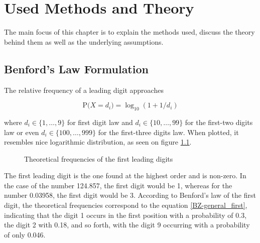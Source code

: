 \chapter{Used Methods and Theory}

The main focus of this chapter is to explain the methods used, discuss the theory behind them as well as the underlying assumptions. 

\section{Benford's Law Formulation}

The relative frequency of a leading digit approaches 

\begin{equation}
    \label{BZ-general_first}
\text{P(} X = d_i\text{)}= \log_{10}(1+1/d_i)
\end{equation}

where $d_i \in \{1,\dots,9\}$ for first digit law and $d_i \in \{10,\dots,99\}$ for the first-two digits law or even $d_i \in \{100,\dots,999\}$ for the first-three digits law. When plotted, it resembles nice logarithmic distribution, as seen on figure \ref{fig:FL}.  \cite{Cerqueti2202,Hronova2023,Newcomb1881}

\begin{figure}[h]
    \centering
    \caption{Theoretical frequencies of the first leading digits}
    \label{fig:FL}
    \pgfplotsset{width=8.5cm,compat=1.18}
\end{figure}

The first leading digit is the one found at the highest order and is non-zero. In the case of the number 124.857, the first digit would be 1, whereas for the number 0.03958, the first digit would be 3. According to Benford's law of the first digit, the theoretical frequencies correspond to the equation \ref{BZ-general_first}, indicating that the digit 1 occurs in the first position with a probability of 0.3, the digit 2 with 0.18, and so forth, with the digit 9 occurring with a probability of only 0.046.

